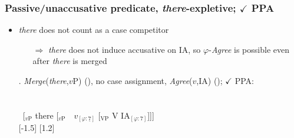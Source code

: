 \documentclass[letterpaper,10pt]{handout_nick}
\begin{document}
\subsubsection{Passive/unaccusative predicate, \emph{there}-expletive; $\checkmark$ PPA}
\begin{itemize}
\item \emph{there} does not count as a case competitor
\begin{itemize}
\item[$\Rightarrow$] \emph{there} does not induce accusative on IA, so $\varphi$-\emph{Agree} is possible even after \emph{there} is merged
\end{itemize}
\ex. \emph{Merge}(\emph{there},$v$P) (\fms{$\varphi$}), no case assignment, \emph{Agree}($v$,IA) (\fas{$\varphi$}); $\checkmark$ PPA:\\\\\\
\ [$_\text{$v$P}$ \hspace*{-.3cm}there [$_\text{$v$P}$\ \ \hspace*{-.2cm}\hspace*{-.2cm}$v_{[\varphi:\underline{7}]}$ [$_\text{VP}$ V \hspace*{-.3cm}IA$_{[\varphi:7]}$]]]\\
[-1.5]
[1.2]

\end{itemize}
\end{document}
